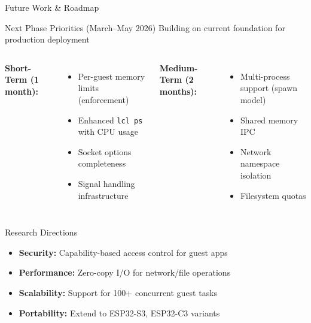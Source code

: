 \documentclass[aspectratio=169, 10pt]{beamer}
\begin{document}
\begin{frame}{Future Work \& Roadmap}
    \begin{block}{Next Phase Priorities (March--May 2026)}
        \centering
        Building on current foundation for production deployment
    \end{block}

    \vspace{0.3cm}
    \begin{columns}[T]
        \textbf{Short-Term (1 month):}
        \vspace{0.1cm}
        \begin{itemize}\setlength{\itemsep}{3pt}
            \item[$\square$] Per-guest memory limits (enforcement)
            \item[$\square$] Enhanced \texttt{lcl ps} with CPU usage
            \item[$\square$] Socket options completeness
            \item[$\square$] Signal handling infrastructure
        \end{itemize}

        \textbf{Medium-Term (2 months):}
        \vspace{0.1cm}
        \begin{itemize}\setlength{\itemsep}{3pt}
            \item[$\square$] Multi-process support (spawn model)
            \item[$\square$] Shared memory IPC
            \item[$\square$] Network namespace isolation
            \item[$\square$] Filesystem quotas
        \end{itemize}
    \end{columns}

    \vspace{0.3cm}
    \begin{alertblock}{Research Directions}
        \begin{itemize}\setlength{\itemsep}{2pt}
            \item \textbf{Security:} Capability-based access control for guest apps
            \item \textbf{Performance:} Zero-copy I/O for network/file operations
            \item \textbf{Scalability:} Support for 100+ concurrent guest tasks
            \item \textbf{Portability:} Extend to ESP32-S3, ESP32-C3 variants
        \end{itemize}
    \end{alertblock}
\end{frame}
\end{document}
